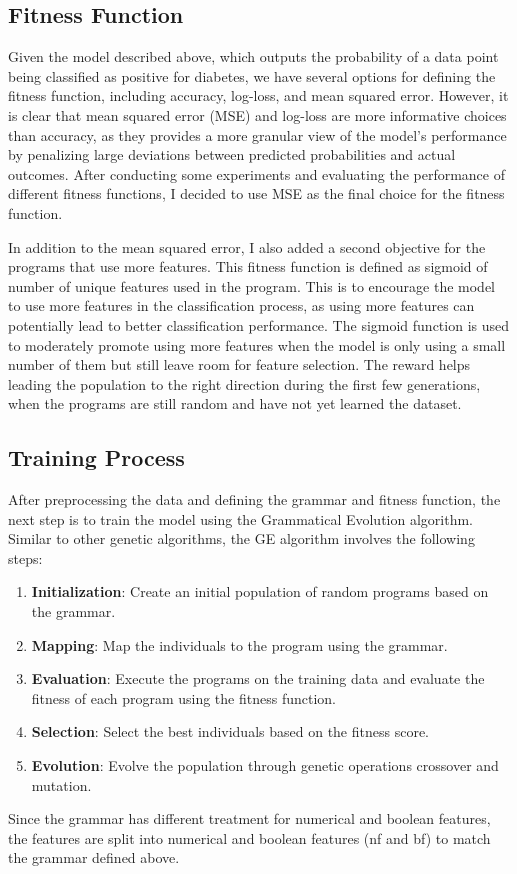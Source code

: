\documentclass{article}
\begin{document}
    \subsection{Fitness Function}
    Given the model described above, which outputs the probability of a data point being classified as positive for diabetes, we have several options for defining the fitness function, including accuracy, log-loss, and mean squared error.
    However, it is clear that mean squared error (MSE) and log-loss are more informative choices than accuracy, as they provides a more granular view of the model's performance by penalizing large deviations between predicted probabilities and actual outcomes. 
    After conducting some experiments and evaluating the performance of different fitness functions, I decided to use MSE as the final choice for the fitness function.

    In addition to the mean squared error, I also added a second objective for the programs that use more features.
    This fitness function is defined as sigmoid of number of unique features used in the program.
    This is to encourage the model to use more features in the classification process, as using more features can potentially lead to better classification performance.
    The sigmoid function is used to moderately promote using more features when the model is only using a small number of them but still leave room for feature selection.
    The reward helps leading the population to the right direction during the first few generations, when the programs are still random and have not yet learned the dataset.


    \subsection{Training Process}
    \label{subsec:training-process}

    After preprocessing the data and defining the grammar and fitness function, the next step is to train the model using the Grammatical Evolution algorithm.
    Similar to other genetic algorithms, the GE algorithm involves the following steps:
    \begin{enumerate}
        \item \textbf{Initialization}: Create an initial population of random programs based on the grammar. 
        \item \textbf{Mapping}: Map the individuals to the program using the grammar.
        \item \textbf{Evaluation}: Execute the programs on the training data and evaluate the fitness of each program using the fitness function. 
        \item \textbf{Selection}: Select the best individuals based on the fitness score. 
        \item \textbf{Evolution}: Evolve the population through genetic operations crossover and mutation.
    \end{enumerate}
    Since the grammar has different treatment for numerical and boolean features, the features are split into numerical and boolean features (nf and bf) to match the grammar defined above.
\end{document}
